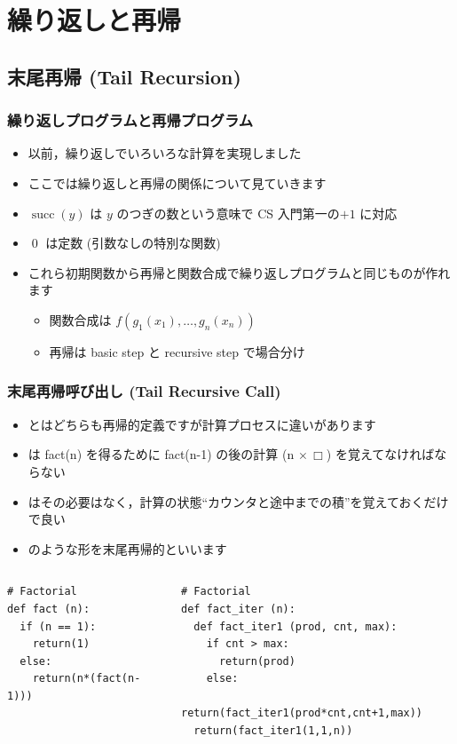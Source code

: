 \section{繰り返しと再帰}
\subsection{末尾再帰 (Tail Recursion)}
\begin{frame}
\frametitle{繰り返しプログラムと再帰プログラム}
  \begin{itemize}
\item 以前，繰り返しでいろいろな計算を実現しました
\item ここでは繰り返しと再帰の関係について見ていきます
\item \(\operatorname{succ}(y)\) は $y$ のつぎの数という意味で CS 入門第一の\(+1\) に対応
\item \(\operatorname{0}\) は定数 (引数なしの特別な関数)
\item これら初期関数から再帰と関数合成で繰り返しプログラムと同じものが作れます
    \begin{itemize}
\item 関数合成は \(f(g_1(x_1),\ldots,g_n(x_n))\) 
\item 再帰は basic step と recursive step で場合分け
    \end{itemize}
  \end{itemize}
\end{frame}
\begin{frame}
\frametitle{末尾再帰呼び出し (Tail Recursive Call)}
  \begin{itemize}
\item {}とはどちらも再帰的定義ですが計算プロセスに違いがあります
\item {} は fact(n) を得るために fact(n-1) の後の計算 (n  $\times\,\Box$) を覚えてなければならない
\item {} はその必要はなく，計算の状態``カウンタと途中までの積''を覚えておくだけで良い
\item {} のような形を末尾再帰的といいます
  \end{itemize}
\vspace{-2em}
  \begin{columns}[t]
    \begin{column}{0.45\textwidth}
      \begin{lstlisting}[caption={再帰プロセス版},label=fact-rec1]
# Factorial
def fact (n):
  if (n == 1):
    return(1)
  else:
    return(n*(fact(n-1)))
      \end{lstlisting}
    \end{column}
    \begin{column}{0.5\textwidth}
      \begin{lstlisting}[firstnumber=16,caption={繰り返しプロセス版},label=fact-iter]
# Factorial
def fact_iter (n):
  def fact_iter1 (prod, cnt, max):
    if cnt > max:
      return(prod)
    else:
      return(fact_iter1(prod*cnt,cnt+1,max))
  return(fact_iter1(1,1,n))
      \end{lstlisting}
    \end{column}
  \end{columns}
\end{frame}
